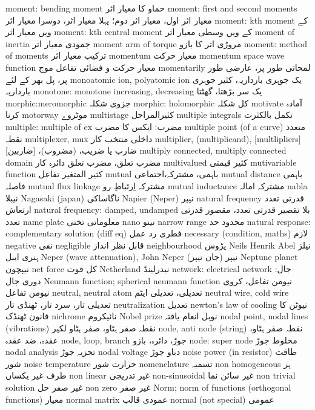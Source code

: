 moment: bending moment	خماو کا معیار اثر
moment: first and second moments	معیار اثر اول، معیار اثر دوم؛ پہلا معیار اثر، دوسرا معیار اثر
moment: kth moment	کے ویں معیار اثر
moment: kth central moment	کے ویں وسطی معیار اثر
moment of inertia	جمودی معیار اثر
moment arm of torque	مروڑی اثر کا بازو
moment: method of moments	ترکیب معیار اثر
momentum	معیار حرکت
momentum space wave function	معیار حرکت و فضائی تفاعل موج
momentarily	لمحاتی طور پر، عارضی طور پر، پل بھر کے لئے
monoatomic ion, polyatomic ion	یک جوہری بارداریہ،  کثیر جوہری بارداریہ
monotone: monotone increasing, decreasing	یک سر بڑھتا، گھٹتا
morphic:meromorphic	جزوی شکلہ
morphic: holomorphic	کل شکلہ
motivate	آمادہ کرنا
motorway	موٹروے
multistage	کثیرالمراحل
multiple integrals	تکمل بالکثرت
multiple: multiple of ex	مضرب: ایکس کا مضرب
multiple point (of a curve)	متعدد نقطہ
multiplexer, mux	داخلی منتخب کار
multiplier, (multiplicand), [multlipliers]	ضارب یا ضریب، (مضروب)، [ضاربین]
multiply connected, multiply connected domain	مضرب تعلق، مضرب تعلق دائرہ کار
multivalued	کثیر قیمتی
mutivariable function	کثیر المتغیر تفاعل
mutual	باہمی، مشترکہ،اجتماعی
mutual distance	باہمی فاصلہ
mutual flux linkage	مشترکہ اِرتَباطِ رو
mutual inductance	مشترکہ امالہ
nabla	نیبلا
Nagasaki (japan)	ناگاساکی
Napier (Neper)	نیپر
natural frequency	قدرتی تعدد ارتعاش
natural frequency: damped, undamped	بلا تقصیر قدرتی تعدد، مقصور قدرتی تعدد
name plate	معلوماتی تختی
nano	نینو
narrow range	محدود حد
natural response: complementary solution (diff eq)	فطری رد عمل
necessary (condition, maths)	لازم
negative	نفی
negligible	قابل نظر انداز
neighbourhood	پڑوس
Neils Henrik Abel	نیلز ہنری ایبل
Neper (wave attenuation), John Neper	نیپر (جان نیپر)
Neptune planet	نیپچون
net force	کل قوت
Netherland	نیدرلینڈ
network: electrical network	جال: دوری جال
Neumann function; spherical neumann function	نیومن تفاعل، کروی نیومن تفاعل
neutral, neutral atom	تعدیلی، تعدیلی ایٹم
neutral wire, cold wire	تعدیلی تار، سرد تار، ٹھنڈی تار
neutralization	تعدیل
newton's law of cooling	نیوٹن کا قانون ٹھنڈک
nichrome	نائیکروم
Nobel prize	نوبل انعام یافتہ
nodal point, nodal lines (vibrations)	نقطہ صفر ہٹاو، صفر ہٹاو لکیر
node, anti node (string)	نقطہ صفر ہٹاو، عقدہ، ضد عقدہ
node, loop, branch	جوڑ، دائرہ، بازو
node: super node	مخلوط جوڑ
nodal analysis	تجزیہ جوڑ
nodal voltage	دباو جوڑ
noise power (in resistor)	طاقت شور
noise temperature	حرارت شور
nomenclature	تسمیہ
non homogeneous	ہر طرف غیر یکساں
non linear	غیر تدریجی
non-sinusoidal	غیر سائن نما
non trivial solution	غیر صفر حل
non zero	غیر صفر
Norm; norm of functions (orthogonal functions)	معیار
normal matrix	عمودی قالب
normal (not special)	عمومی
